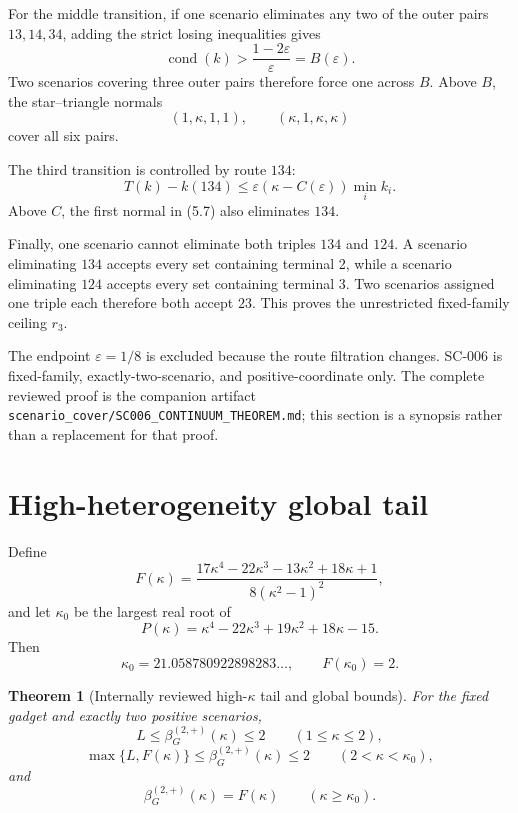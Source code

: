 \documentclass[11pt]{article}
\newtheorem{theorem}{Theorem}[section]
\theoremstyle{remark}
\newcommand{\cond}{\operatorname{cond}}
\newcommand{\eps}{\varepsilon}
\begin{document}
For the middle transition, if one scenario eliminates any two of the outer
pairs $13,14,34$, adding the strict losing inequalities gives
\[
\cond(k)>\frac{1-2\eps}{\eps}=B(\eps).
\tag{5.6}
\]
Two scenarios covering three outer pairs therefore force one across $B$.
Above $B$, the star--triangle normals
\[
(1,\kappa,1,1),\qquad(\kappa,1,\kappa,\kappa)
\tag{5.7}
\]
cover all six pairs.

The third transition is controlled by route $134$:
\[
T(k)-k(134)\le\eps(\kappa-C(\eps))\min_i k_i.
\tag{5.8}
\]
Above $C$, the first normal in (5.7) also eliminates $134$.

Finally, one scenario cannot eliminate both triples $134$ and $124$.
A scenario eliminating $134$ accepts every set containing terminal 2, while a
scenario eliminating $124$ accepts every set containing terminal 3. Two
scenarios assigned one triple each therefore both accept $23$. This proves
the unrestricted fixed-family ceiling $r_3$.

The endpoint $\eps=1/8$ is excluded because the route filtration changes.
SC-006 is fixed-family, exactly-two-scenario, and positive-coordinate only.
The complete reviewed proof is the companion artifact
\texttt{scenario\_cover/SC006\_CONTINUUM\_THEOREM.md}; this section is a
synopsis rather than a replacement for that proof.

\section{High-heterogeneity global tail}

Define
\[
F(\kappa)=
\frac{17\kappa^4-22\kappa^3-13\kappa^2+18\kappa+1}
{8(\kappa^2-1)^2},
\tag{6.1}
\]
and let $\kappa_0$ be the largest real root of
\[
P(\kappa)=\kappa^4-22\kappa^3+19\kappa^2+18\kappa-15.
\tag{6.2}
\]
Then
\[
\kappa_0=21.058780922898283\ldots,\qquad F(\kappa_0)=2.
\tag{6.3}
\]

\begin{theorem}[Internally reviewed high-$\kappa$ tail and global bounds]
For the fixed gadget and exactly two positive scenarios,
\[
L\le\beta_G^{(2,+)}(\kappa)\le2\qquad(1\le\kappa\le2),
\]
\[
\max\{L,F(\kappa)\}\le\beta_G^{(2,+)}(\kappa)\le2
\qquad(2<\kappa<\kappa_0),
\]
and
\[
\boxed{\beta_G^{(2,+)}(\kappa)=F(\kappa)
\qquad(\kappa\ge\kappa_0).}
\tag{6.4}
\]
\end{theorem}
\end{document}
